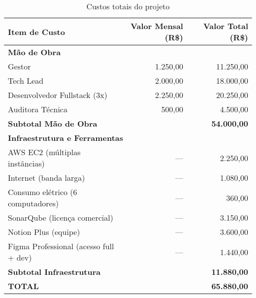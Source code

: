 \begin{table}[htbp]
	\centering
	\caption{Custos totais do projeto}
	\label{tab:custo-total-projeto}
	\begin{tabular}{lrr}
		\toprule
		\textbf{Item de Custo} & \textbf{Valor Mensal (R\$)} & \textbf{Valor Total (R\$)} \\
		\midrule
		\multicolumn{3}{l}{\textbf{Mão de Obra}} \\
		\quad Gestor & 1.250,00 & 11.250,00 \\
		\quad Tech Lead & 2.000,00 & 18.000,00 \\
		\quad Desenvolvedor Fullstack (3x) & 2.250,00 & 20.250,00 \\
		\quad Auditora Técnica & 500,00 & 4.500,00 \\
		\cmidrule{3-3}
		\multicolumn{2}{l}{\textbf{Subtotal Mão de Obra}} & \textbf{54.000,00} \\
		\midrule
		\multicolumn{3}{l}{\textbf{Infraestrutura e Ferramentas}} \\
		\quad AWS EC2 (múltiplas instâncias) & --- & 2.250,00 \\
		\quad Internet (banda larga) & --- & 1.080,00 \\
		\quad Consumo elétrico (6 computadores) & --- & 360,00 \\
		\quad SonarQube (licença comercial) & --- & 3.150,00 \\
		\quad Notion Plus (equipe) & --- & 3.600,00 \\
		\quad Figma Professional (acesso full + dev) & --- & 1.440,00 \\
		\cmidrule{3-3}
		\multicolumn{2}{l}{\textbf{Subtotal Infraestrutura}} & \textbf{11.880,00} \\
		\midrule
		\multicolumn{2}{l}{\textbf{TOTAL}} & \textbf{65.880,00} \\
		\bottomrule
	\end{tabular}
\end{table}